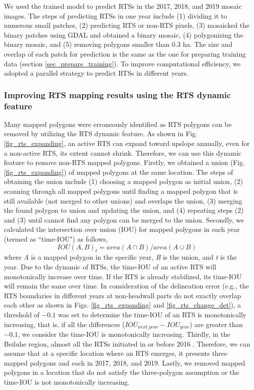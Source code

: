 \documentclass[authoryear,preprint,review,12pt]{elsarticle}
\begin{document}
We used the trained model to predict RTSs in the 2017, 2018, and 2019 mosaic images. 
The steps of predicting RTSs in one year include (1) dividing it to numerous small patches, 
(2) predicting RTS or non-RTS pixels, 
(3) mosaicked the binary patches using GDAL and obtained a binary mosaic, 
(4) polygonizing the binary mosaic, and 
(5) removing polygons smaller than 0.3 ha. 
The size and overlap of each patch for prediction is the same as the one for preparing training data (section \ref{sec_prepare_training}). 
To improve computational efficiency, we adopted a parallel strategy to predict RTSs in different years.


\subsubsection{Improving RTS mapping results using the RTS dynamic feature}
\label{sec_improving_using_rts_dynamic}

Many mapped polygons were erroneously identified as RTS polygons can be removed by utilizing the RTS dynamic feature. 
As shown in Fig. \ref{fig_rts_expanding}, an active RTS can expand toward upslope annually, even for a non-active RTS, its extent cannot shrink. 
Therefore, we can use this dynamic feature to remove non-RTS mapped polygons. 
Firstly, we obtained a union (Fig. \ref{fig_rts_expanding}) of mapped polygons at the same location.
The steps of obtaining the union include (1) choosing a mapped polygon as initial union, (2) scanning through all mapped polygons until finding a mapped polygon that is still available (not merged to other unions) and overlaps the union, (3) merging the found polygon to union and updating the union, and (4) repeating steps (2) and (3) until cannot find any polygon can be merged to the union. 
Secondly, we calculated the intersection over union (IOU) for mapped polygons in each year (termed as ``time-IOU") as follows, 
\begin{equation}
IOU(A,B)_{t}=area(A \cap B)/area(A \cup B)
\label{equ_time_iou}
\end{equation}
where \emph{A} is a mapped polygon in the specific year, \emph{B} is the union, and \emph{t} is the year. 
Due to the dynamic of RTSs, the time-IOU of an active RTS will monotonically increase over time. 
If the RTS is already stabilized, its time-IOU will remain the same over time. 
In consideration of the delineation error (e.g., the RTS boundaries in different years at non-headwall parts do not exactly overlap each other as shown in Figs. \ref{fig_rts_expanding} and \ref{fig_rts_change_det}), a threshold of $-0.1$ was set to determine the time-IOU of an RTS is monotonically increasing, that is, if all the differences ($IOU_{next\_year}-IOU_{year}$) are greater than $-0.1$, we consider the time-IOU is monotonically increasing. 
Thirdly, in the Beiluhe region, almost all the RTSs initiated in or before 2016 \citep{luo2019recent}.
Therefore, we can assume that at a specific location where an RTS emerges, it presents three mapped polygons and each in 2017, 2018, and 2019. 
Lastly, we removed mapped polygons in a location that do not satisfy the three-polygon assumption or the time-IOU is not monotonically increasing.
 
\end{document}
